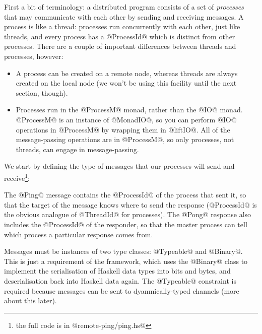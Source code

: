 
First a bit of terminology: a distributed program consists of a set of
\emph{processes} that may communicate with each other by sending and
receiving messages.  A process is like a thread: processes run
concurrently with each other, just like threads, and every process has
a @ProcessId@ which is distinct from other processes.  There are a
couple of important differences between threads and processes,
however:

\begin{itemize}
\item A process can be created on a remote node, whereas threads are
  always created on the local node (we won't be using this facility
  until the next section, though).

\item Processes run in the @ProcessM@ monad, rather than the @IO@
  monad. @ProcessM@ is an instance of @MonadIO@, so you can perform
  @IO@ operations in @ProcessM@ by wrapping them in @liftIO@.  All of
  the message-passing operations are in @ProcessM@, so only processes,
  not threads, can engage in message-passing.
\end{itemize}


We start by defining the type of messages that our processes will send
and receive\footnote{the full code is in @remote-ping/ping.hs@}:


The @Ping@ message contains the @ProcessId@ of the process that sent
it, so that the target of the message knows where to send the response
(@ProcessId@ is the obvious analogue of @ThreadId@ for processes).
The @Pong@ response also includes the @ProcessId@ of the responder, so
that the master process can tell which process a particular response
comes from.

Messages must be instances of two type classes: @Typeable@
and @Binary@.  This is just a requirement of the framework, which uses
the @Binary@ class to implement the serialisation of Haskell data
types into bits and bytes, and deserialisation back into Haskell data
again.  The @Typeable@ constraint is required because messages can be
sent to dyanmically-typed channels (more about this later).

